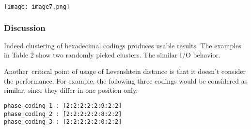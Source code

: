 \documentclass{jhps}
\begin{document}
\begingroup
  \centering
  \texttt{[image: image7.png]}
  \label{fig:use_case:pm_quant:length}
\endgroup

\subsubsection{Discussion}
Indeed clustering of hexadecimal codings produces usable results.
The examples in Table 2 show two randomly picked clusters.
The similar I/O behavior.

Another\ critical point of usage of Levenshtein distance is that it doesn't consider the performance.
For example, the following three codings would be considered as similar, since they differ in one position only.

\begin{lstlisting}
phase_coding_1 : [2:2:2:2:2:9:2:2]
phase_coding_2 : [2:2:2:2:2:8:2:2]
phase_coding_3 : [2:2:2:2:2:0:2:2]
\end{lstlisting}
\end{document}
